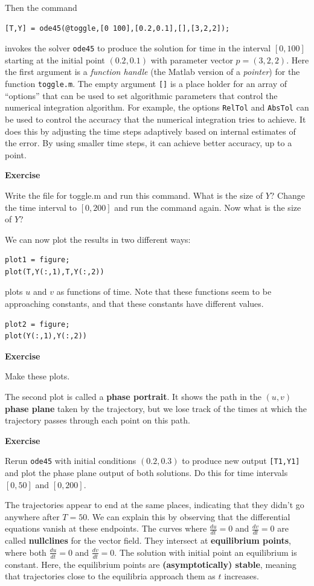 \documentclass [11pt]{article}
\newcounter{exercise}
\numberwithin{exercise}{section}
\newcommand{\exnumber}{\addtocounter{exercise}{1} \theexercise \thinspace}
\begin{document}
Then the command 
\begin{verbatim}
[T,Y] = ode45(@toggle,[0 100],[0.2,0.1],[],[3,2,2]);
\end{verbatim}
invokes the solver \texttt{ode45} to produce the solution for time in the 
interval $[0,100]$ starting at the initial point $(0.2,0.1)$ with 
parameter vector $p = (3,2,2)$. Here the first argument is a {\it function handle}
(the Matlab version of a {\it pointer})
for the function \texttt{toggle.m}. The empty argument \texttt{[]} is a 
place holder for an array of ``options'' that can be used to set algorithmic
parameters that control the numerical integration algorithm. For example,
the options \texttt{RelTol} and \texttt{AbsTol} can be used to control the 
accuracy that the numerical integration tries to achieve. It does this by
adjusting the time steps adaptively based on internal estimates of the error.
By using smaller time steps, it can achieve better accuracy, up to a point.

{\bf Exercise \exnumber} Write the file for toggle.m and run this command.
What is the size of $Y$? Change the time interval to $[0,200]$ and run the 
command again. Now what is the size of $Y$?

We can now plot the results in two different ways:
\begin{verbatim}
plot1 = figure;
plot(T,Y(:,1),T,Y(:,2)) 
\end{verbatim}
plots $u$ and $v$ as functions of time. Note that these functions seem to 
be approaching constants, and that these constants have different values.
\begin{verbatim}
plot2 = figure;
plot(Y(:,1),Y(:,2)) 
\end{verbatim}

{\bf Exercise \exnumber} Make these plots.

The second plot is called a {\bf phase portrait}. It shows the path in the 
$(u,v)$ {\bf phase plane} taken by the trajectory, but we lose track of the 
times at which the trajectory passes through each point on this path.

{\bf Exercise \exnumber} Rerun \texttt{ode45} with initial conditions
$(0.2,0.3)$ to produce new output \texttt{[T1,Y1]} and plot the phase
plane output of both solutions. Do this for time intervals $[0,50]$ and $[0,200]$.

The trajectories appear to end at the same places, indicating that they didn't
go anywhere after $T = 50$. We can explain this by observing that the differential
equations vanish at these endpoints. The curves where $\frac{du}{dt} = 0$
and $\frac{dv}{dt} = 0$ are called {\bf nullclines} for the vector field.
They intersect at {\bf equilibrium points}, where both  $\frac{du}{dt} = 0$ 
and  $\frac{dv}{dt} = 0$. The solution with initial point an equilibrium is
constant. Here, the equilibrium points are {\bf (asymptotically) stable}, meaning
that trajectories close to the equilibria approach them as $t$ increases.
\end{document}
